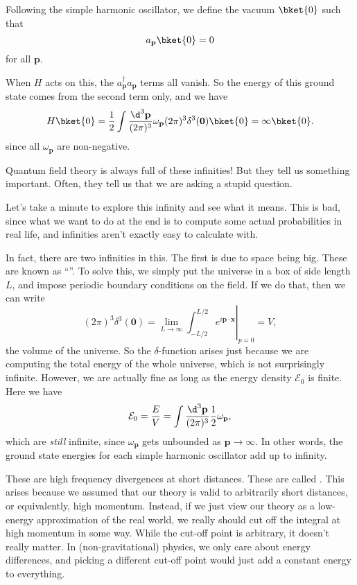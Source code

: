 \documentclass[a4paper]{article}
\begin{document}
Following the simple harmonic oscillator, we define the vacuum $\bket{0}$ such that
\[
  a_\mathbf{p} \bket{0} = 0
\]
for all $\mathbf{p}$.

When $H$ acts on this, the $a_\mathbf{p}^\dagger a_\mathbf{p}$ terms all vanish. So the energy of this ground state comes from the second term only, and we have
\[
  H\bket{0} = \frac{1}{2}\int \frac{\d^3 \mathbf{p}}{(2\pi)^3} \omega_\mathbf{p} (2\pi)^3 \delta^3(\mathbf{0}) \bket{0} = \infty\bket{0}.
\]
since all $\omega_\mathbf{p}$ are non-negative.

Quantum field theory is always full of these infinities! But they tell us something important. Often, they tell us that we are asking a stupid question.

Let's take a minute to explore this infinity and see what it means. This is bad, since what we want to do at the end is to compute some actual probabilities in real life, and infinities aren't exactly easy to calculate with.

In fact, there are two infinities in this. The first is due to space being big. These are known as ``''. To solve this, we simply put the universe in a box of side length $L$, and impose periodic boundary conditions on the field. If we do that, then we can write
\[
  (2\pi)^3 \delta^3(\mathbf{0}) = \lim_{L \to \infty} \left.\int_{-L/2}^{L/2} e^{i\mathbf{p}\cdot \mathbf{x}}\right|_{p = 0} = V,
\]
the volume of the universe. So the $\delta$-function arises just because we are computing the total energy of the whole universe, which is not surprisingly infinite. However, we are actually fine as long as the energy density $\mathcal{E}_0$ is finite. Here we have
\[
  \mathcal{E}_0 = \frac{E}{V} = \int \frac{\d^3 \mathbf{p}}{(2\pi)^3} \frac{1}{2} \omega_\mathbf{p},
\]
which are \emph{still} infinite, since $\omega_\mathbf{p}$ gets unbounded as $\mathbf{p} \to \infty$. In other words, the ground state energies for each simple harmonic oscillator add up to infinity.

These are high frequency divergences at short distances. These are called . This arises because we assumed that our theory is valid to arbitrarily short distances, or equivalently, high momentum. Instead, if we just view our theory as a low-energy approximation of the real world, we really should cut off the integral at high momentum in some way. While the cut-off point is arbitrary, it doesn't really matter. In (non-gravitational) physics, we only care about energy differences, and picking a different cut-off point would just add a constant energy to everything.
\end{document}
